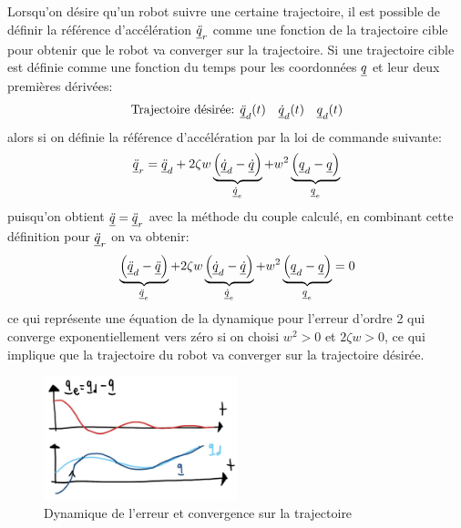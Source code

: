 Lorsqu'on désire qu'un robot suivre une certaine trajectoire, il est possible de définir la référence d'accélération $\underline{\ddot{q}}_r$ comme une fonction de la trajectoire cible pour obtenir que le robot va converger sur la trajectoire. Si une trajectoire cible est définie comme une fonction du temps pour les coordonnées $\underline{q}$ et leur deux premières dérivées:
\begin{align}
\text{Trajectoire désirée: } \underline{\ddot{q}}_d(t) \quad \underline{\dot{q}}_d(t) \quad \underline{q}_d(t)
\end{align}
alors si on définie la référence d'accélération par la loi de commande suivante:
\begin{align}
\underline{\ddot{q}}_r = \underline{\ddot{q}}_d + 2 \zeta w 
\underbrace{\left( \underline{\dot{q}}_d - \underline{\dot{q}}\right)}_{ \underline{\dot{q}}_e}
+ w^2
\underbrace{\left( \underline{q}_d - \underline{q}\right)}_{ \underline{q}_e}
\end{align}
puisqu'on obtient $\underline{\ddot{q}} = \underline{\ddot{q}}_r$ avec la méthode du couple calculé, en combinant cette définition pour $\underline{\ddot{q}}_r$ on va obtenir:
\begin{align}
\underbrace{\left( \underline{\ddot{q}}_d - \underline{\ddot{q}} \right)}_{ \underline{\ddot{q}}_e}
 + 2 \zeta w 
\underbrace{\left( \underline{\dot{q}}_d - \underline{\dot{q}}\right)}_{ \underline{\dot{q}}_e}
+ w^2
\underbrace{\left( \underline{q}_d - \underline{q}\right)}_{ \underline{q}_e} = 0
\label{eq:computedtorqueerrordynamic}
\end{align}
ce qui représente une équation de la dynamique pour l'erreur d'ordre 2 qui converge exponentiellement vers zéro si on choisi $w^2>0$ et $2 \zeta w > 0$, ce qui implique que la trajectoire du robot va converger sur la trajectoire désirée. 
\begin{figure}[ht]
	\centering
		\includegraphics[width=0.50\textwidth]{fig/errordynamic.jpg}
	\caption{Dynamique de l'erreur et convergence sur la trajectoire}
	\label{fig:errordynamic}
\end{figure}


